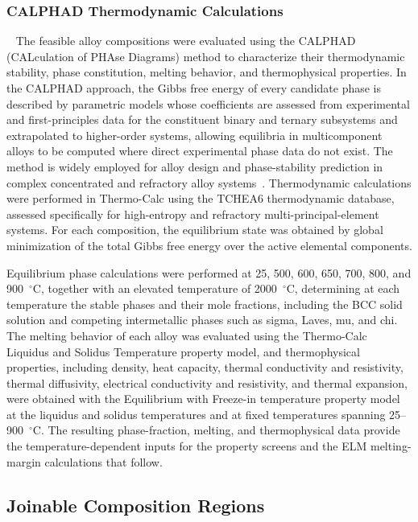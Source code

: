 \subsubsection{CALPHAD Thermodynamic Calculations}
 
The feasible alloy compositions were evaluated using the CALPHAD
(CALculation of PHAse Diagrams) method to characterize their thermodynamic
stability, phase constitution, melting behavior, and thermophysical
properties. In the CALPHAD approach, the Gibbs free energy of every candidate
phase is described by parametric models whose coefficients are assessed from
experimental and first-principles data for the constituent binary and ternary
subsystems and extrapolated to higher-order systems, allowing equilibria in
multicomponent alloys to be computed where direct experimental phase data do
not exist. The method is widely employed for alloy design and phase-stability
prediction in complex concentrated and refractory alloy
systems~\cite{li2023calphad,conway2022thermodynamic}. Thermodynamic
calculations were performed in Thermo-Calc using the TCHEA6 thermodynamic
database, assessed specifically for high-entropy and refractory
multi-principal-element systems. For each composition, the equilibrium state
was obtained by global minimization of the total Gibbs free energy over the
active elemental components.

Equilibrium phase calculations were performed at 25, 500, 600, 650, 700, 800,
and 900~$^{\circ}\mathrm{C}$, together with an elevated temperature of
2000~$^{\circ}\mathrm{C}$, determining at each temperature the stable phases
and their mole fractions, including the BCC solid solution and competing
intermetallic phases such as sigma, Laves, mu, and chi. The melting behavior
of each alloy was evaluated using the Thermo-Calc Liquidus and Solidus
Temperature property model, and thermophysical properties, including density, heat
capacity, thermal conductivity and resistivity, thermal diffusivity,
electrical conductivity and resistivity, and thermal expansion, were obtained
with the Equilibrium with Freeze-in temperature property model at the liquidus
and solidus temperatures and at fixed temperatures spanning
25--900~$^{\circ}\mathrm{C}$. The resulting phase-fraction, melting, and
thermophysical data provide the temperature-dependent inputs for the property
screens and the ELM melting-margin calculations that follow.

\subsection{Joinable Composition Regions}
\label{sec:joinable}


